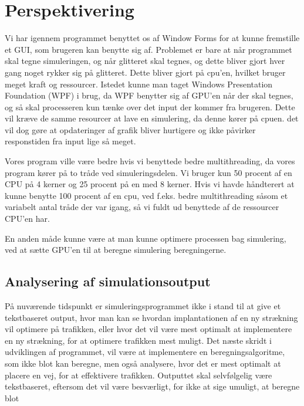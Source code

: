\chapter{Perspektivering}\label{Perspektivering}
Vi har igennem programmet benyttet os af Window Forms for at kunne fremstille et GUI, som brugeren kan benytte sig af. Problemet er bare at når programmet skal tegne simuleringen, og når glitteret skal tegnes, og dette bliver gjort hver gang noget rykker sig på glitteret. Dette bliver gjort på cpu'en, hvilket bruger meget kraft og ressourcer. Istedet kunne man taget Windows Presentation Foundation (WPF) i brug, da WPF benytter sig af GPU'en når der skal tegnes, og så skal processeren kun tænke over det input der kommer fra brugeren. Dette vil kræve de samme resourcer at lave en simulering, da denne kører på cpuen. det vil dog gøre at opdateringer af grafik bliver hurtigere og ikke påvirker responstiden fra input lige så meget.

\vspace{5mm}

Vores program ville være bedre hvis vi benyttede bedre multithreading, da vores program kører på to tråde ved simuleringsdelen. Vi bruger kun 50 procent af en CPU på 4 kerner og 25 procent på en med 8 kerner. Hvis vi havde håndterert at kunne benytte 100 procent af en cpu, ved f.eks. bedre multithreading såsom et variabelt antal tråde der var igang, så vi fuldt ud benyttede af de ressourcer CPU'en har.

\vspace{5mm}

En anden måde kunne være at man kunne optimere processen bag simulering, ved at sætte GPU'en til at beregne simulering beregningerne.

\section{Analysering af simulationsoutput}
På nuværende tidspunkt er simuleringsprogrammet ikke i stand til at give et tekstbaseret output, hvor man kan se hvordan implantationen af en ny strækning vil optimere på trafikken, eller hvor det vil være mest optimalt at implementere en ny strækning, for at optimere trafikken mest muligt. Det næste skridt i udviklingen af programmet, vil være at implementere en beregningsalgoritme, som ikke blot kan beregne, men også analysere, hvor det er mest optimalt at placere en vej, for at effektivere trafikken. Outputtet skal selvfølgelig være tekstbaseret, eftersom det vil være besværligt, for ikke at sige umuligt, at beregne blot 

